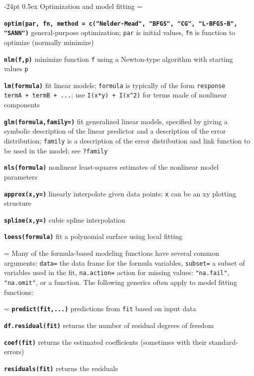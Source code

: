 \documentclass[10pt,landscape]{article}
\makeatletter
\renewcommand\section{\@startsection{section}{1}{0mm}%
                                     {-24pt}%
                                     {0.5ex}%
                                {\color{blue}\normalfont\large\bfseries}}
\newcommand{\code}{\texttt}
\newcommand{\bcode}[1]{\texttt{\textbf{#1}}}
\makeatother
\begin{document}
\begin{multicols}{3}
\section{Optimization and model fitting}
\everypar={\hangindent=9mm}

\bcode{optim(par, fn, method = c("Nelder-Mead", "BFGS", "CG",
  "L-BFGS-B", "SANN")} general-purpose optimization; \code{par} is
  initial values, \code{fn} is function to optimize (normally minimize)

\bcode{nlm(f,p)} minimize function \code{f} using a Newton-type
algorithm with starting values \code{p}

\bcode{lm(formula)} fit linear models; \code{formula} is typically of
     the form \code{response ~ termA + termB + ...}; use \code{I(x*y)
     + I(x\^{}2)} for terms made of nonlinear components

\bcode{glm(formula,family=)} fit generalized linear models, specified by
     giving a symbolic description of the linear predictor and a
     description of the error distribution; \code{family} is a
     description of the error distribution and link function to
          be used in the model; see \code{?family}

\bcode{nls(formula)} nonlinear least-squares estimates of the nonlinear
     model parameters

\bcode{approx(x,y=)} linearly interpolate given data points; \code{x} can be an
xy plotting structure

\bcode{spline(x,y=)} cubic spline interpolation

\bcode{loess(formula)} fit a polynomial surface using local fitting

\everypar={\hangindent=0mm}
Many of the formula-based modeling functions have several common
arguments: \code{data=} the data frame for the formula variables,
\code{subset=} a subset of variables used in the fit,
\code{na.action=} action for missing values: \code{"na.fail"}, \code{"na.omit"}, or
a function. The following generics often apply to model fitting functions: 

\everypar={\hangindent=9mm}
\bcode{predict(fit,...)}  predictions from \code{fit} based on input data

\bcode{df.residual(fit)}  returns the number of residual degrees of freedom

\bcode{coef(fit)}  returns the estimated coefficients (sometimes with their standard-errors)

\bcode{residuals(fit)}  returns the residuals


\end{multicols}
\end{document}

